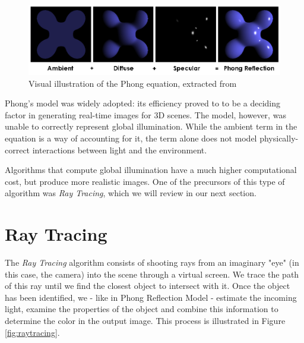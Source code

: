\begin{figure}[h]
  \centering
  \includegraphics[width=\textwidth,height=\textheight,keepaspectratio]{images/3_theoretical_foundations/phong.png}
  \caption{Visual illustration of the Phong equation, extracted from \cite{wiki:phong}}
  \label{fig:phong}
\end{figure}

Phong's model was widely adopted: its efficiency proved to to be a deciding factor in generating real-time images for 3D scenes. The model, however, was unable to correctly represent global illumination. While the ambient term in the equation is a way of accounting for it, the term alone does not model physically-correct interactions between light and the environment. 

Algorithms that compute global illumination have a much higher computational cost, but produce more realistic images. One of the precursors of this type of algorithm was \textit{Ray Tracing}, which we  will review in our next section.

\section{Ray Tracing}

The \textit{Ray Tracing} algorithm \cite{Whitted:1980} consists of shooting rays from an imaginary "eye" (in this case, the camera) into the scene through a virtual screen. We trace the path of this ray until we find the closest object to intersect with it. Once the object has been identified, we - like in Phong Reflection Model - estimate the incoming light, examine the properties of the object and combine this information to determine the color in the output image. This process is illustrated in Figure \ref{fig:raytracing}.

